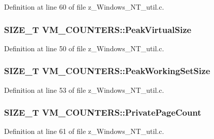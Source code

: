 Definition at line 60 of file z\-\_\-\-Windows\-\_\-\-N\-T\-\_\-util.\-c.

\hypertarget{structVM__COUNTERS_ab4c550548ddf9b6357ea0f57ce1cf946}{
\subsubsection[{Peak\-Virtual\-Size}]{\setlength{\rightskip}{0pt plus 5cm}S\-I\-Z\-E\-\_\-\-T V\-M\-\_\-\-C\-O\-U\-N\-T\-E\-R\-S\-::\-Peak\-Virtual\-Size}}\label{structVM__COUNTERS_ab4c550548ddf9b6357ea0f57ce1cf946}


Definition at line 50 of file z\-\_\-\-Windows\-\_\-\-N\-T\-\_\-util.\-c.

\hypertarget{structVM__COUNTERS_a15bea203127750ef7fe4fbcd682a7126}{
\subsubsection[{Peak\-Working\-Set\-Size}]{\setlength{\rightskip}{0pt plus 5cm}S\-I\-Z\-E\-\_\-\-T V\-M\-\_\-\-C\-O\-U\-N\-T\-E\-R\-S\-::\-Peak\-Working\-Set\-Size}}\label{structVM__COUNTERS_a15bea203127750ef7fe4fbcd682a7126}


Definition at line 53 of file z\-\_\-\-Windows\-\_\-\-N\-T\-\_\-util.\-c.

\hypertarget{structVM__COUNTERS_aacbc9ccd46f05cb18cc67ee292ed1a82}{
\subsubsection[{Private\-Page\-Count}]{\setlength{\rightskip}{0pt plus 5cm}S\-I\-Z\-E\-\_\-\-T V\-M\-\_\-\-C\-O\-U\-N\-T\-E\-R\-S\-::\-Private\-Page\-Count}}\label{structVM__COUNTERS_aacbc9ccd46f05cb18cc67ee292ed1a82}


Definition at line 61 of file z\-\_\-\-Windows\-\_\-\-N\-T\-\_\-util.\-c.


